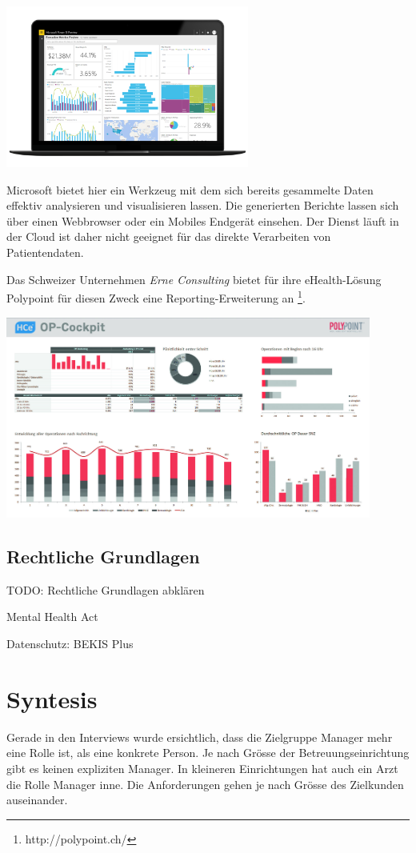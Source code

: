 \documentclass[a4paper]{scrreprt}
\begin{document}
\includegraphics[width=0.6\textwidth]{img/research_ms-powerbi.png}

Microsoft bietet hier ein Werkzeug mit dem sich bereits gesammelte Daten effektiv analysieren und visualisieren lassen. Die generierten Berichte lassen sich über einen Webbrowser oder ein Mobiles Endgerät einsehen. Der Dienst läuft in der Cloud ist daher nicht geeignet für das direkte Verarbeiten von Patientendaten.

\bigskip

Das Schweizer Unternehmen \textit{Erne Consulting} bietet für ihre eHealth-Lösung Polypoint für diesen Zweck eine Reporting-Erweiterung an \footnote{http://polypoint.ch/}.

\includegraphics[width=0.9\textwidth]{img/research_polypoint_op-cockpit.jpg}



\subsection{Rechtliche Grundlagen}
TODO: Rechtliche Grundlagen abklären

Mental Health Act

Datenschutz: BEKIS Plus





\section{Syntesis}
Gerade in den Interviews wurde ersichtlich, dass die Zielgruppe Manager mehr eine Rolle ist, als eine konkrete Person. Je nach Grösse der Betreuungseinrichtung gibt es keinen expliziten Manager. In kleineren Einrichtungen hat auch ein Arzt die Rolle Manager inne.
Die Anforderungen gehen je nach Grösse des Zielkunden auseinander.
\end{document}

